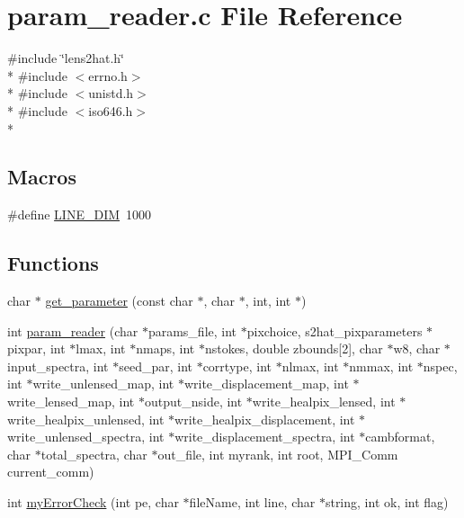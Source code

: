 \section{param\-\_\-reader.\-c File Reference}
\label{rng_2common_2param__reader_8c}
{\ttfamily \#include \char`\"{}lens2hat.\-h\char`\"{}}\\*
{\ttfamily \#include $<$errno.\-h$>$}\\*
{\ttfamily \#include $<$unistd.\-h$>$}\\*
{\ttfamily \#include $<$iso646.\-h$>$}\\*
\subsection*{Macros}
\begin{DoxyCompactItemize}
\item 
\#define \hyperlink{rng_2common_2param__reader_8c_a7d2d24512e1704eaf046667bee38b7ef}{L\-I\-N\-E\-\_\-\-D\-I\-M}~1000
\end{DoxyCompactItemize}
\subsection*{Functions}
\begin{DoxyCompactItemize}
\item 
char $\ast$ \hyperlink{rng_2common_2param__reader_8c_ab3cc75c29a38da58b8a99b6f65096891}{get\-\_\-parameter} (const char $\ast$, char $\ast$, int, int $\ast$)
\item 
int \hyperlink{rng_2common_2param__reader_8c_a990ccd7e0b3352322502e77838c159d7}{param\-\_\-reader} (char $\ast$params\-\_\-file, int $\ast$pixchoice, s2hat\-\_\-pixparameters $\ast$pixpar, int $\ast$lmax, int $\ast$nmaps, int $\ast$nstokes, double zbounds\mbox{[}2\mbox{]}, char $\ast$w8, char $\ast$input\-\_\-spectra, int $\ast$seed\-\_\-par, int $\ast$corrtype, int $\ast$nlmax, int $\ast$nmmax, int $\ast$nspec, int $\ast$write\-\_\-unlensed\-\_\-map, int $\ast$write\-\_\-displacement\-\_\-map, int $\ast$write\-\_\-lensed\-\_\-map, int $\ast$output\-\_\-nside, int $\ast$write\-\_\-healpix\-\_\-lensed, int $\ast$write\-\_\-healpix\-\_\-unlensed, int $\ast$write\-\_\-healpix\-\_\-displacement, int $\ast$write\-\_\-unlensed\-\_\-spectra, int $\ast$write\-\_\-displacement\-\_\-spectra, int $\ast$cambformat, char $\ast$total\-\_\-spectra, char $\ast$out\-\_\-file, int myrank, int root, M\-P\-I\-\_\-\-Comm current\-\_\-comm)
\item 
int \hyperlink{rng_2common_2param__reader_8c_a70bcbd531a6e4abc62d73f5b4532c2cc}{my\-Error\-Check} (int pe, char $\ast$file\-Name, int line, char $\ast$string, int ok, int flag)
\end{DoxyCompactItemize}


